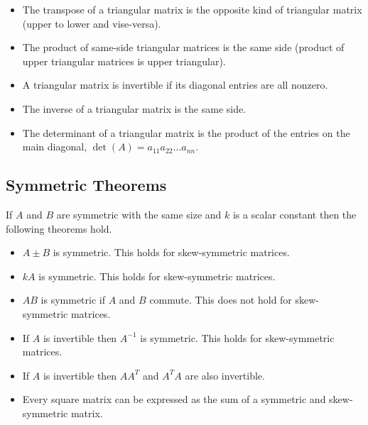 \documentclass[12pt]{article}
\begin{document}
\begin{itemize}
    \item The transpose of a triangular matrix is the opposite kind of triangular matrix (upper to lower and vise-versa).
    \item The product of same-side triangular matrices is the same side (product of upper triangular matrices is upper triangular).
    \item A triangular matrix is invertible if its diagonal entries are all nonzero.
    \item The inverse of a triangular matrix is the same side.
    \item The determinant of a triangular matrix is the product of the entries on the main diagonal, $\det(A) = a_{11}a_{22}\dots a_{nn}$.
\end{itemize}


\subsection{Symmetric Theorems}

If $A$ and $B$ are symmetric with the same size and $k$ is a scalar constant then the following theorems hold.
\begin{itemize}
    \item $A \pm B$ is symmetric. This holds for skew-symmetric matrices.
    \item $kA$ is symmetric. This holds for skew-symmetric matrices.
    \item $AB$ is symmetric if $A$ and $B$ commute. This does not hold for skew-symmetric matrices.
    \item If $A$ is invertible then $A^{-1}$ is symmetric. This holds for skew-symmetric matrices.
    \item If $A$ is invertible then $AA^T$ and $A^TA$ are also invertible.
    \item Every square matrix can be expressed as the sum of a symmetric and skew-symmetric matrix.
\end{itemize}
\end{document}
